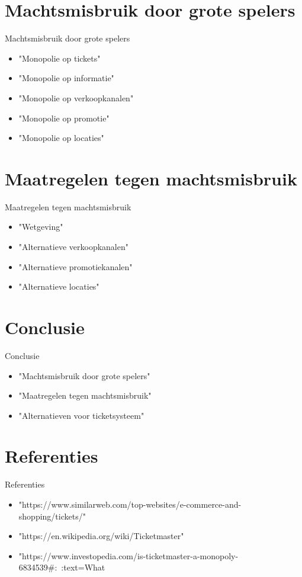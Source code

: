 \documentclass{beamer}
\begin{document}
\section{Machtsmisbruik door grote spelers}
\begin{frame}{Machtsmisbruik door grote spelers}
    \begin{itemize}
        \item "Monopolie op tickets"
        \item "Monopolie op informatie"
        \item "Monopolie op verkoopkanalen"
        \item "Monopolie op promotie"
        \item "Monopolie op locaties"
    \end{itemize}
\end{frame}
    
\section{Maatregelen tegen machtsmisbruik}
\begin{frame}{Maatregelen tegen machtsmisbruik}
    \begin{itemize}
        \item "Wetgeving"
        \item "Alternatieve verkoopkanalen"
        \item "Alternatieve promotiekanalen"
        \item "Alternatieve locaties"
    \end{itemize}
\end{frame}
    
\section{Conclusie}
\begin{frame}{Conclusie}
    \begin{itemize}
        \item "Machtsmisbruik door grote spelers"
        \item "Maatregelen tegen machtsmisbruik"
        \item "Alternatieven voor ticketsysteem"
    \end{itemize}
\end{frame}
    
\section{Referenties}
\begin{frame}{Referenties}
    \begin{itemize}
        \item "https://www.similarweb.com/top-websites/e-commerce-and-shopping/tickets/"
        \item "https://en.wikipedia.org/wiki/Ticketmaster"
        \item "https://www.investopedia.com/is-ticketmaster-a-monopoly-6834539#:~:text=What%
    \end{itemize}
\end{frame}
\end{document}
